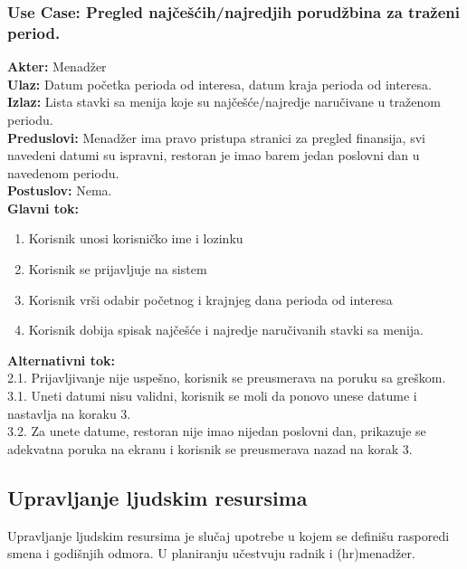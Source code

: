 \documentclass{article}
\begin{document}
\subsubsection{\textbf{Use Case}: Pregled najčešćih/najredjih porudžbina za traženi period.}
\textbf{Akter:} Menadžer\\
\textbf{Ulaz:} Datum početka perioda od interesa, datum kraja perioda od interesa.\\
\textbf{Izlaz:} Lista stavki sa menija koje su najčešće/najredje naručivane u traženom periodu.\\
\textbf{Preduslovi:} Menadžer ima pravo pristupa stranici za pregled finansija, svi navedeni datumi su ispravni, restoran je imao barem jedan poslovni dan u navedenom periodu.\\
\textbf{Postuslov:} Nema.\\
\textbf{Glavni tok:}
\begin{enumerate}
\item Korisnik unosi korisničko ime i lozinku
\item Korisnik se prijavljuje na sistem
\item Korisnik vrši odabir početnog i krajnjeg dana perioda od interesa
\item Korisnik dobija spisak najčešće i najredje naručivanih stavki sa menija.
\end{enumerate}
\textbf{Alternativni tok:}\\
        2.1. Prijavljivanje nije uspešno, korisnik se preusmerava na poruku sa greškom.\\
        3.1. Uneti datumi nisu validni, korisnik se moli da ponovo unese datume i nastavlja na koraku 3.\\
        3.2. Za unete datume, restoran nije imao nijedan poslovni dan, prikazuje se adekvatna poruka na ekranu i korisnik se preusmerava nazad na korak 3.\\


\subsection{Upravljanje ljudskim resursima}
Upravljanje ljudskim resursima je slučaj upotrebe u kojem se definišu rasporedi smena i godišnjih odmora. U planiranju učestvuju radnik i (hr)menadžer.
\end{document}
